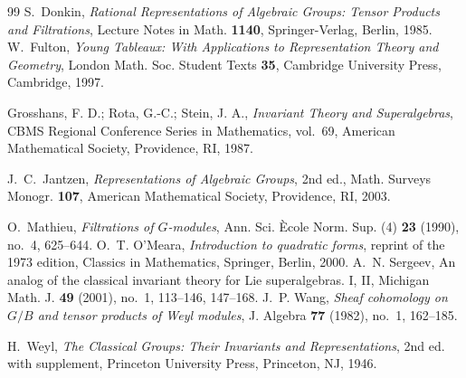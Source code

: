 \documentclass[10pt]{amsart}
\theoremstyle{definition}
\theoremstyle{remark}
\begin{document}
\begin{thebibliography}{99}
S.~Donkin,
\emph{Rational Representations of Algebraic Groups: Tensor Products and Filtrations},
Lecture Notes in Math. \textbf{1140}, Springer-Verlag, Berlin, 1985.
W.~Fulton,
\emph{Young Tableaux: With Applications to Representation Theory and Geometry},
London Math. Soc. Student Texts \textbf{35}, Cambridge University Press,
Cambridge, 1997.

Grosshans, F. D.; Rota, G.-C.; Stein, J. A.,
\emph{Invariant Theory and Superalgebras},
CBMS Regional Conference Series in Mathematics, vol.~69,
American Mathematical Society, Providence, RI, 1987.

J.~C.~Jantzen,
\emph{Representations of Algebraic Groups}, 2nd ed.,
Math. Surveys Monogr. \textbf{107}, American Mathematical Society,
Providence, RI, 2003.

O.~Mathieu,
\emph{Filtrations of $G$-modules},
Ann. Sci. \`Ecole Norm. Sup. (4) \textbf{23} (1990), no.~4, 625--644.
O.~T. O'Meara, {\it Introduction to quadratic forms}, reprint of the 1973 edition, 
Classics in Mathematics, Springer, Berlin, 2000.
A.~N. Sergeev, An analog of the classical invariant theory for Lie superalgebras. I, II, Michigan Math. J. {\bf 49} (2001), no.~1, 113--146, 147--168.
J.~P. Wang,
\emph{Sheaf cohomology on $G/B$ and tensor products of Weyl modules},
J. Algebra \textbf{77} (1982), no.~1, 162--185.

H.~Weyl,
\emph{The Classical Groups: Their Invariants and Representations},
2nd ed. with supplement, Princeton University Press, Princeton, NJ, 1946.

\end{thebibliography} 
\end{document}
